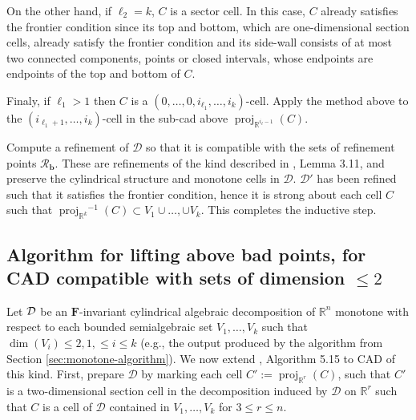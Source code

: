 \documentclass[
]{book}
\theoremstyle{definition}
\theoremstyle{definition}
\theoremstyle{definition}
\theoremstyle{definition}
\theoremstyle{remark}
\begin{document}
On the other hand, if \(\ell_2 = k\), \(C\) is a sector cell. In this case, \(C\) already satisfies the frontier condition since its top and bottom, which are one-dimensional section cells, already satisfy the frontier condition and its side-wall consists of at most two connected components, points or closed intervals, whose endpoints are endpoints of the top and bottom of \(C\).

Finaly, if \(\ell_1 > 1\) then \(C\) is a \((0,\ldots,0,i_{\ell_1},\ldots,i_k)\)-cell. Apply the method above to the \((i_{\ell_1 + 1},\ldots,i_k)\)-cell in the sub-cad above \({\operatorname{proj}_{\mathbb{R}^{i_\ell - 1}}}(C)\).

Compute a refinement of \(\mathcal{D}\) so that it is compatible with the sets of refinement points \(\mathcal{R}_\mathbf{b}\). These are refinements of the kind described in \citet{bgv15}, Lemma 3.11, and preserve the cylindrical structure and monotone cells in \(\mathcal{D}\).
\(\mathcal{D'}\) has been refined such that it satisfies the frontier condition, hence it is strong about each cell \(C\) such that \({\operatorname{proj}_{\mathbb{R}^{k}}}^{-1}(C) \subset V_1\cup \ldots, \cup V_k\). This completes the inductive step.

\hypertarget{sec:ext-lazard-algorithm}{%
\subsection{\texorpdfstring{Algorithm for lifting above bad points, for CAD compatible with sets of dimension \(\le 2\)}{Algorithm for lifting above bad points, for CAD compatible with sets of dimension \textbackslash le 2}}\label{sec:ext-lazard-algorithm}}

Let \(\cal D\) be an \(\mathbf{F}\)-invariant cylindrical algebraic decomposition of \(\mathbb{R}^n\) monotone with respect to each bounded semialgebraic set \(V_1,\ldots, V_k\) such that \(\dim(V_i) \le 2, 1,\le i \le k\) (e.g., the output produced by the algorithm from Section \ref{sec:monotone-algorithm}).
We now extend \citet{lazard10}, Algorithm 5.15 to CAD of this kind.
First, prepare \(\mathcal{D}\) by marking each cell \(C' := {\operatorname{proj}_{\mathbb{R}^{r}}}(C)\), such that \(C'\) is a two-dimensional section cell in the decomposition induced by \(\mathcal{D}\) on \(\mathbb{R}^r\) such that \(C\) is a cell of \(\mathcal{D}\) contained in \(V_1,\ldots,V_k\) for \(3 \le r \le n\).
\end{document}
